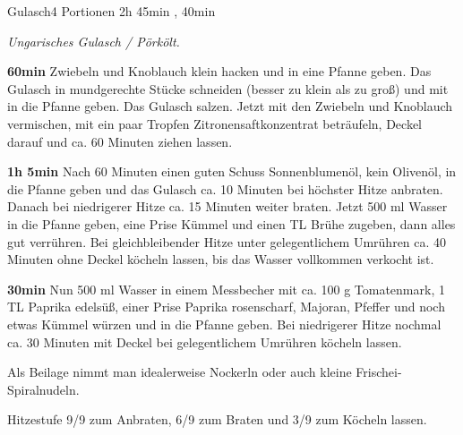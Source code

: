 \documentclass[../recipe-collections/cooking.tex]{subfiles}
\begin{document}
\begin{recipe}{Gulasch}{4 Portionen }{2h 45min , 40min }

  \freeform{}\textit{Ungarisches Gulasch / Pörkölt.}


  \textbf{60min}
  Zwiebeln und Knoblauch klein hacken und in eine Pfanne geben.
  Das Gulasch in mundgerechte Stücke schneiden (besser zu klein als zu groß) und mit in die Pfanne geben.
  Das Gulasch salzen.
  Jetzt mit den Zwiebeln und Knoblauch vermischen, mit ein paar Tropfen Zitronensaftkonzentrat beträufeln, Deckel darauf und ca. 60 Minuten ziehen lassen.


  \textbf{1h 5min}
  Nach 60 Minuten einen guten Schuss Sonnenblumenöl, kein Olivenöl, in die Pfanne geben und das Gulasch ca. 10 Minuten bei höchster Hitze anbraten.
  Danach bei niedrigerer Hitze ca. 15 Minuten weiter braten.
  Jetzt 500 ml Wasser in die Pfanne geben, eine Prise Kümmel und einen TL Brühe zugeben, dann alles gut verrühren.
  Bei gleichbleibender Hitze unter gelegentlichem Umrühren ca. 40 Minuten ohne Deckel köcheln lassen, bis das Wasser vollkommen verkocht ist.


  \textbf{30min}
  Nun 500 ml Wasser in einem Messbecher mit ca. 100 g Tomatenmark, 1 TL Paprika edelsüß, einer Prise Paprika rosenscharf, Majoran, Pfeffer und noch etwas Kümmel würzen und in die Pfanne geben.
  Bei niedrigerer Hitze nochmal ca. 30 Minuten mit Deckel bei gelegentlichem Umrühren köcheln lassen.

  \freeform{}\hrulefill{}

  \freeform{}
  Als Beilage nimmt man idealerweise Nockerln oder auch kleine Frischei-Spiralnudeln.

  \freeform{}
  Hitzestufe 9/9 zum Anbraten, 6/9 zum Braten und 3/9 zum Köcheln lassen.

\end{recipe}
\end{document}
